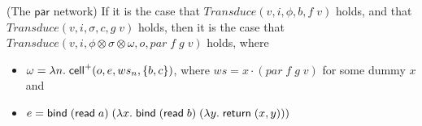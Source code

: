 \begin{lemma}{(The $\mathsf{par}$ network)}
If it is the case that $\mathit{Transduce}(v, i, \phi, b, f\;v)$ holds, and that
$\mathit{Transduce}(v, i, \sigma, c, g\;v)$ holds, then it is the case that
$\mathit{Transduce}(v, i, \phi \otimes \sigma \otimes \omega, o, \mathit{par}\;f\;g\;v)$ holds,
where 

\begin{itemize}
\item $\omega = \lambda n.\;\mathsf{cell}^{+}({o}, {e}, {ws_n}, {\{{b,c}\}})$, where $ws = x \cdot (\mathit{par}\;f\;g\;v)$ for some dummy $x$ and
\item $e = \mathsf{bind}\; (\mathsf{read}\; a)\; (\lambda x.\;\mathsf{bind}\; (\mathsf{read}\; b)\; (\lambda y.\;\mathsf{return}\; (x,y)))$
\end{itemize}
\end{lemma}

